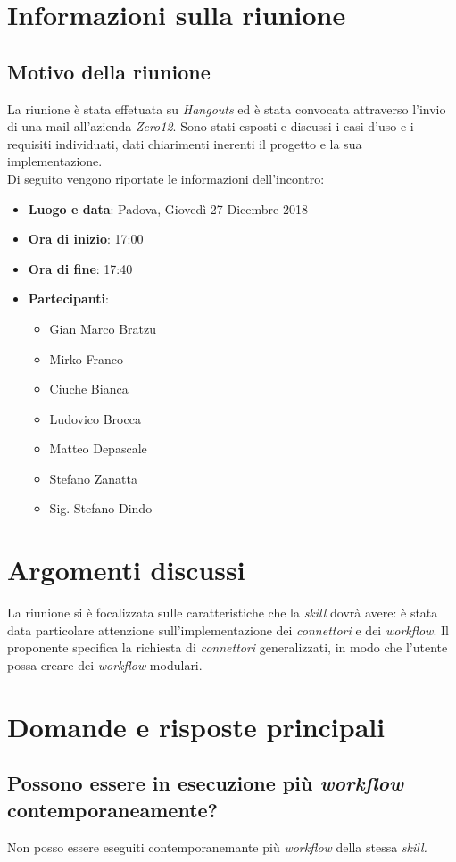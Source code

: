 \documentclass[a4paper,12pt]{article}
\begin{document}
	
	
	
	\section{Informazioni sulla riunione}
	\subsection{Motivo della riunione}
	La riunione è stata effetuata su  \textit{Hangouts} ed è stata convocata attraverso l'invio di una mail all'azienda  \textit{Zero12}. Sono stati esposti e discussi i casi d'uso e i requisiti individuati, dati chiarimenti inerenti il progetto e la sua implementazione.\\
	Di seguito vengono riportate le informazioni dell'incontro:
	\begin{itemize}
		\item \textbf{Luogo e data}: Padova, Giovedì 27 Dicembre 2018
		\item \textbf{Ora di inizio}: 17:00
		\item \textbf{Ora di fine}: 17:40
		\item \textbf{Partecipanti}:  
		\begin{itemize}
			\item Gian Marco Bratzu
			\item Mirko Franco
			\item Ciuche Bianca
			\item Ludovico Brocca
			\item Matteo Depascale
			\item Stefano Zanatta
			\item Sig. Stefano Dindo
		\end{itemize}
	\end{itemize}

	\section{Argomenti discussi}
	La riunione si è focalizzata sulle caratteristiche che la  \textit{skill} dovrà avere: è stata data particolare attenzione sull'implementazione dei \textit{connettori} e dei \textit{workflow}. Il proponente specifica la richiesta di \textit{connettori} generalizzati, in modo che l'utente possa creare dei \textit{workflow} modulari.
	\section{Domande e risposte principali}
	\subsection{Possono essere in esecuzione più \textit{workflow} contemporaneamente?}
	Non posso essere eseguiti contemporanemante più \textit{workflow} della stessa \textit{skill.}
\end{document}

